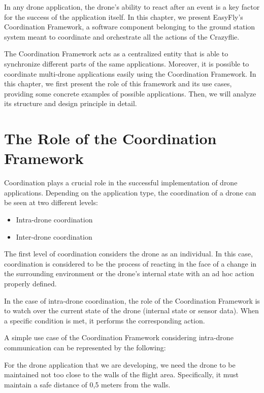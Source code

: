 In any drone application, the drone's ability to react after an event is a key factor for the success of the application itself. 
In this chapter, we present EasyFly's Coordination Framework, a software component belonging to the ground station system meant to coordinate and orchestrate all the actions of the Crazyflie. 

The Coordination Framework acts as a centralized entity that is able to synchronize different parts of the same applications.
Moreover, it is possible to coordinate multi-drone applications easily using the Coordination Framework.
In this chapter, we first present the role of this framework and its use cases, providing some concrete examples of possible applications. 
Then, we will analyze its structure and design principle in detail.


\section{The Role of the Coordination Framework}\label{sec:coordination_framework_rolw}

Coordination plays a crucial role in the successful implementation of drone applications. 
Depending on the application type, the coordination of a drone can be seen at two different levels:
\begin{itemize}
    \item Intra-drone coordination
    \item Inter-drone coordination
\end{itemize}

The first level of coordination considers the drone as an individual. 
In this case, coordination is considered to be the process of reacting in the face of a change in the surrounding environment or the drone's internal state with an ad hoc action properly defined.

In the case of intra-drone coordination, the role of the Coordination Framework is to watch over the current state of the drone (internal state or sensor data). 
When a specific condition is met, it performs the corresponding action.

A simple use case of the Coordination Framework considering intra-drone communication can be represented by the following:

\begin{displayquote}
    For the drone application that we are developing, we need the drone to be maintained not too close to the walls of the flight area. 
    Specifically, it must maintain a safe distance of 0,5 meters from the walls.
\end{displayquote}

